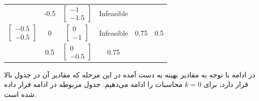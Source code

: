 \documentclass[14pt, a4paper]{extarticle}
\begin{document}
\begin{latin}
\begin{longtable}{|c|c|c|c|c|c|}
		& -0.5 &$\begin{bmatrix} -1 \\ -1.5 \end{bmatrix}$      & Infeasible                        &            &        \\ \cline{2-4}
		\multirow{-3}{*}{$\begin{bmatrix} -0.5 \\ -0.5 \end{bmatrix}$}& 0   &$\begin{bmatrix} 0 \\ -1 \end{bmatrix}$      & Infeasible                        &    0.75       &  0.5	      \\ \cline{2-4}
			& 0.5 &$\begin{bmatrix} 0 \\ -0.5 \end{bmatrix}$      &    0.75                    &                &      \\ \hline
		
	\end{longtable}
\end{latin}

	در ادامه با توجه به مقادیر بهینه به دست آمده در این مرحله که مقادیر آن در جدول بالا قرار دارد، برای 
	$k = 0$
	محاسبات را ادامه می‌دهیم. جدول مربوطه در ادامه فرار داده شده است.
	\newpage
\end{document}
